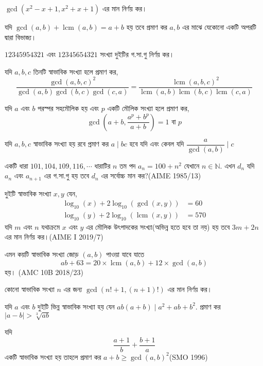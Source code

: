 \documentclass[a4paper,11pt]{article}
\DeclareMathOperator{\lcm}{lcm}
\begin{document}
\begin{Exercise}
	\label{gcd}
	\begin{prob}
		$\gcd(x^2-x+1,x^2+x+1)$ এর মান নির্ণয় কর। 
	\end{prob}
	\begin{prob}
		যদি $\gcd(a,b)+\lcm(a,b)=a+b$ হয় তবে প্রমাণ কর $a,b$ এর মাঝে যেকোনো একটি অপরটি দ্বারা বিভাজ্য। 
	\end{prob}
	\begin{prob}
		$12345954321$ এবং $12345654321$ সংখ্যা দুইটির গ.সা.গু নির্ণয় কর। 
	\end{prob}
	\begin{prob}
		যদি $a,b,c$ তিনটি স্বাভাবিক সংখ্যা হলে প্রমাণ কর,
		\[\dfrac{\gcd(a,b,c)^2}{\gcd(a,b)\gcd(b,c)\gcd(c,a)}=\dfrac{\lcm(a,b,c)^2}{\lcm(a,b)\lcm(b,c)\lcm(c,a)}\]
	\end{prob}
	\begin{prob}
		যদি $a$ এবং $b$ পরস্পর সহমৌলিক হয় এবং $p$ একটি মৌলিক সংখ্যা হলে প্রমাণ কর, 
		\[\gcd \left(a+b,\dfrac{a^p+b^p}{a+b} \right)=1 \text{ বা } p\]
	\end{prob}
	\begin{prob}
		যদি $a,b,c$ স্বাভাবিক সংখ্যা হয় রবে প্রমাণ কর $a \mid bc$ হবে যদি এবং কেবল যদি $\dfrac{a}{\gcd(a,b)} \mid c$
	\end{prob}
	\begin{prob}
		একটি ধারা $101,104,109,116,\cdots$ ধারাটির $n$ তম পদ $a_n=100+n^2$ যেখানে $n \in \mathbb{N}$. এখন $d_n$ যদি $a_n$ এবং $a_{n+1}$ এর গ.সা.গু হয় তবে $d_n$ এর সর্বোচ্চ মান কর?(AIME 1985/13)
	\end{prob}
	\begin{prob}
		দুইটি স্বাভাবিক সংখ্যা $x,y$ যেন, 
		\begin{align*}
			\log_{10}(x)+2\log_{10}(\gcd(x,y)) & =60  \\
			\log_{10}(y)+2\log_{10}(\lcm(x,y)) & =570
		\end{align*}
		যদি $m$ এবং $n$ যথাক্রমে $x$ এবং $y$ এর মৌলিক উৎপাদকের সংখ্যা(অভিন্ন হতে হবে তা নয়) হয় তবে $3m+2n$ এর মান নির্ণয় কর।(AIME I 2019/7)
	\end{prob}
	\begin{prob}
		এমন কয়টি স্বাভাবিক সংখ্যা জোড় $(a,b)$ পাওয়া যাবে যাতে 
		\[ab+63=20\times \lcm(a,b)+12\times \gcd(a,b)\]
		হয়। (AMC 10B 2018/23)
	\end{prob}
	\begin{prob}
		কোনো স্বাভাবিক সংখ্যা $n$ এর জন্য $\gcd(n!+1,(n+1)!)$ এর মান নির্ণয় কর। 
	\end{prob}
	\begin{prob}
		যদি $a$ এবং $b$ দুইটি ভিন্ন স্বাভাবিক সংখ্যা হয় যেন $ab(a+b) \mid a^2+ab+b^2$. প্রমাণ কর $|a-b|> \sqrt[3]{ab}$
	\end{prob}
	\begin{prob}
		\label{xr1.2}
		যদি 
		\[\dfrac{a+1}{b}+\dfrac{b+1}{a}\]
		একটি স্বাভাবিক সংখ্যা হয় তাহলে প্রমাণ কর $a+b \geq \gcd(a,b)^2$(SMO 1996)
	\end{prob}
	
\end{Exercise}
\end{document}

